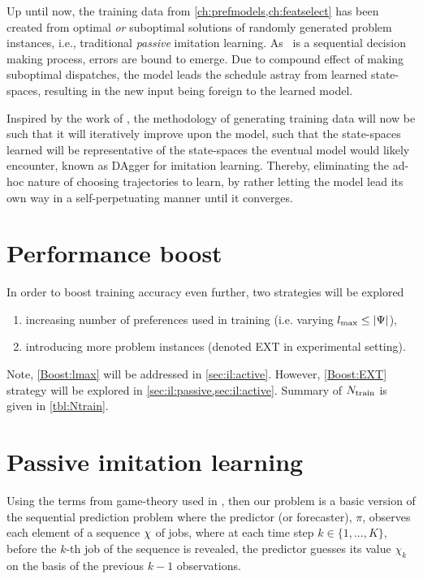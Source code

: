 Up until now, the training data from \cref{ch:prefmodels,ch:featselect} has 
been created from optimal \emph{or} suboptimal solutions of randomly generated 
problem instances, i.e., traditional \emph{passive} imitation learning. 
As \JSP\ is a sequential decision making process, errors are bound to emerge.  
Due to compound effect of making suboptimal dispatches, the model leads the 
schedule astray from learned state-spaces, resulting in the new input being 
foreign to the learned model. 

Inspired by the work of \cite{RossB10,RossGB11}, the methodology of generating 
training data will now be such that it will iteratively improve upon the model, 
such that the state-spaces learned will be representative of the state-spaces 
the eventual model would likely encounter, known as DAgger for imitation 
learning.
Thereby, eliminating the ad-hoc nature of choosing trajectories to learn, by 
rather letting the model lead its own way in a self-perpetuating manner until 
it converges.

\section*{Performance boost}
In order to boost training accuracy even further, two strategies will be 
explored 
\begin{enumerate}[after={{}}, leftmargin=*,
    label={\textbf{Boost.\arabic*}}, ref={{Boost.\arabic*}}]
    \item \label{Boost:lmax} increasing number of preferences used 
    in training (i.e. varying \mbox{$l_{\max} \leq \lvert\Psi\rvert$}),
    \item \label{Boost:EXT} introducing more problem instances 
    (denoted EXT in experimental setting).
\end{enumerate}

Note, \ref{Boost:lmax} will be addressed in \cref{sec:il:active}. 
However, \ref{Boost:EXT} strategy will be explored in 
\cref{sec:il:passive,sec:il:active}. 
Summary of $N_{\text{train}}$ is given in \cref{tbl:Ntrain}.



\section{Passive imitation learning}\label{sec:il:passive}
Using the terms from game-theory used in \citet{CesaBianchi06}, %
then our problem is a basic version of the sequential prediction problem where 
the predictor (or forecaster), $\pi$, observes each element of a sequence 
${\mathbf{\chi}}$ of jobs, where at each time step $k \in \{1,...,K\}$, before the 
$k$-th job of the sequence is revealed, the predictor guesses its value 
$\chi_k$ on the basis of the previous $k-1$ observations. 

